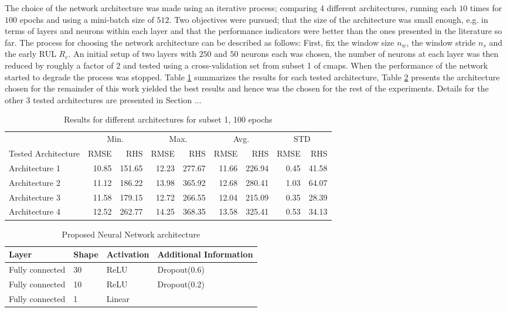 The choice of the network architecture was made using an iterative process; comparing 4 different architectures, running each $10$ times for $100$ epochs and using a mini-batch size of $512$. Two objectives were pursued; that the size of the architecture was small enough, e.g. in terms of layers and neurons within each layer and that the performance indicators were better than the ones presented in the literature so far. The process for choosing the network architecture can be described as follows: First, fix the window size $n_w$, the window stride $n_s$ and the early RUL $R_e$. An initial setup of two layers with $250$ and $50$ neurons each was chosen, the number of neurons at each layer was then reduced by roughly a factor of 2 and tested using a cross-validation set from subset 1 of \gls{cmaps}. When the performance of the network started to degrade the process was stopped. Table  \ref{table:tested_architectures_100} summarizes the results for each tested architecture, Table \ref{table:proposed_nn} presents the architecture chosen for the remainder of this work yielded the best results and hence was the chosen for the rest of the experiments. Details for the other 3 tested architectures are presented in Section ...

\begin{table}[!htb]
\centering
\begin{tabular}{l r r | r r | r r | r r}
	\hline	
	& \multicolumn{2}{c}{Min.} & \multicolumn{2}{c}{Max.}  & \multicolumn{2}{c}{Avg.}  & \multicolumn{2}{c}{STD} \\
	Tested Architecture & RMSE & RHS & RMSE & RHS & RMSE & RHS & RMSE & RHS\\
  	\hline
  	Architecture 1 & 10.85 & 151.65 & 12.23 & 277.67 & 11.66 & 226.94 & 0.45 & 41.58\\
  	Architecture 2 & 11.12 & 186.22 & 13.98 & 365.92 & 12.68 & 280.41 & 1.03 & 64.07\\
  	Architecture 3 & 11.58 & 179.15 & 12.72 & 266.55 & 12.04 & 215.09 & 0.35 & 28.39\\
  	Architecture 4 & 12.52 & 262.77 & 14.25 & 368.35 & 13.58 & 325.41 & 0.53 & 34.13\\
  	\hline
\end{tabular}
\caption{Results for different architectures for subset 1, 100 epochs}
\label{table:tested_architectures_100}
\end{table}

\begin{table}[!htb]
\centering
\begin{tabular}{l l l l}
	\hline
	Layer & Shape & Activation & Additional Information\\
  	\hline
  	Fully connected & 30 & ReLU & Dropout(0.6)\\
  	Fully connected & 10 & ReLU & Dropout(0.2)\\
  	Fully connected & 1 & Linear & \\
  	\hline
\end{tabular}
\caption{Proposed Neural Network architecture}
\label{table:proposed_nn}
\end{table}

